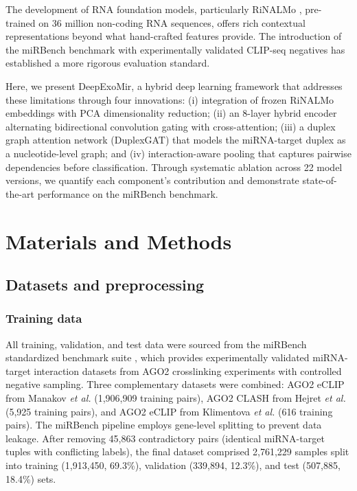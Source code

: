 \documentclass[unnumsec,webpdf,contemporary,large]{oup-authoring-template}
\begin{document}
The development of RNA foundation models, particularly RiNALMo \citep{penic2025}, pre-trained on 36 million non-coding RNA sequences, offers rich contextual representations beyond what hand-crafted features provide. The introduction of the miRBench benchmark \citep{sammut2025} with experimentally validated CLIP-seq negatives has established a more rigorous evaluation standard.

Here, we present DeepExoMir, a hybrid deep learning framework that addresses these limitations through four innovations: (i) integration of frozen RiNALMo embeddings with PCA dimensionality reduction; (ii) an 8-layer hybrid encoder alternating bidirectional convolution gating with cross-attention; (iii) a duplex graph attention network (DuplexGAT) that models the miRNA-target duplex as a nucleotide-level graph; and (iv) interaction-aware pooling that captures pairwise dependencies before classification. Through systematic ablation across 22 model versions, we quantify each component's contribution and demonstrate state-of-the-art performance on the miRBench benchmark.

\section{Materials and Methods}

\subsection{Datasets and preprocessing}

\subsubsection{Training data}
All training, validation, and test data were sourced from the miRBench standardized benchmark suite \citep{sammut2025}, which provides experimentally validated miRNA-target interaction datasets from AGO2 crosslinking experiments with controlled negative sampling. Three complementary datasets were combined: AGO2 eCLIP from Manakov \textit{et al.} (1,906,909 training pairs), AGO2 CLASH from Hejret \textit{et al.} (5,925 training pairs), and AGO2 eCLIP from Klimentova \textit{et al.} (616 training pairs). The miRBench pipeline employs gene-level splitting to prevent data leakage. After removing 45,863 contradictory pairs (identical miRNA-target tuples with conflicting labels), the final dataset comprised 2,761,229 samples split into training (1,913,450, 69.3\%), validation (339,894, 12.3\%), and test (507,885, 18.4\%) sets.
\end{document}
